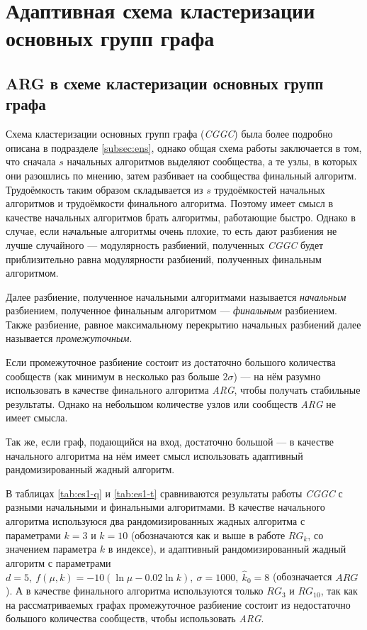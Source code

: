 
\section{Адаптивная схема кластеризации основных групп графа}
\label{sec:ACGGC}



\subsection{ARG в схеме кластеризации основных групп графа}
\label{subsec:arg_in_cggc}

Схема кластеризации основных групп графа (\emph{CGGC}) была более подробно описана в подразделе \ref{subsec:ens}, однако общая схема работы заключается в том, что сначала $s$ начальных алгоритмов выделяют сообщества, а те узлы, в которых они разошлись по мнению, затем разбивает на сообщества финальный алгоритм. Трудоёмкость таким образом складывается из $s$ трудоёмкостей начальных алгоритмов и трудоёмкости финального алгоритма. Поэтому имеет смысл в качестве начальных алгоритмов брать алгоритмы, работающие быстро. Однако в случае, если начальные алгоритмы очень плохие, то есть дают разбиения не лучше случайного --- модулярность разбиений, полученных \emph{CGGC} будет приблизительно равна модулярности разбиений, полученных финальным алгоритмом.

Далее разбиение, полученное начальными алгоритмами называется \emph{начальным} разбиением, полученное финальным алгоритмом --- \emph{финальным} разбиением. Также  разбиение, равное максимальному перекрытию начальных разбиений далее называется \emph{промежуточным}.

Если промежуточное разбиение состоит из достаточно большого количества сообществ (как минимум в несколько раз больше $2\sigma$) --- на нём разумно использовать в качестве финального алгоритма \emph{ARG}, чтобы получать стабильные результаты. Однако на небольшом количестве узлов или сообществ \emph{ARG} не имеет смысла.

Так же, если граф, подающийся на вход, достаточно большой --- в качестве начального алгоритма на нём имеет смысл использовать адаптивный рандомизированный жадный алгоритм.

В таблицах \ref{tab:es1-q} и \ref{tab:es1-t} сравниваются результаты работы \emph{CGGC} с разными начальными и финальными алгоритмами. В качестве начального алгоритма используюся два рандомизированных жадных алгоритма с параметрами $k = 3$ и $k = 10$ (обозначаются как и выше в работе $RG_k$, со значением параметра $k$ в индексе), и адаптивный рандомизированный жадный алгоритм с параметрами $d = 5,\ f(\mu, k) = -10(\ln \mu - 0.02 \ln k),\ \sigma = 1000,\ \hat{k}_0 = 8$ (обозначается $ARG$). А в качестве финального алгоритма используются только $RG_3$ и $RG_{10}$, так как на рассматриваемых графах промежуточное разбиение состоит из недостаточно большого количества сообществ, чтобы использовать \emph{ARG}.

